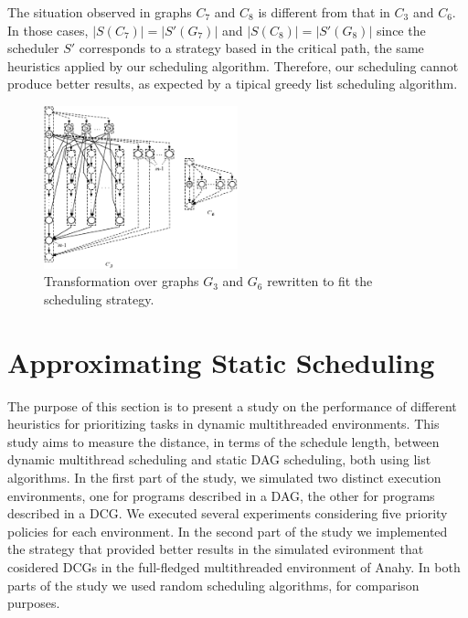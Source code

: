 \documentclass[twocolumn]{svjour3}
\begin{document}
The situation observed in graphs $C_7$ and $C_8$ is different from that in $C_3$ and $C_6$. In those cases, $|S(C_7)| = |S'(G_7)|$ and $|S(C_8)| = |S'(G_8)|$ since the scheduler $S'$ corresponds to a strategy based in the {\color{blue}critical path}, the same heuristics applied by our scheduling algorithm. Therefore, our scheduling cannot produce better results, as expected by a tipical greedy list scheduling algorithm.

\begin{figure}[htb]
\begin{center}
\includegraphics[width=0.5\textwidth,angle=0]{figs/cl3_cl6.eps}
\caption{Transformation over graphs $G_3$ and $G_6$ rewritten to fit the scheduling strategy.}
\label{fig:newC3C6}
\end{center}
\end{figure}

\section{Approximating Static Scheduling} \label{sec:practical_results}

{\color{blue}

The purpose of this section is to present a study on the performance of different heuristics for prioritizing tasks in dynamic multithreaded environments. This study aims to measure the distance, in terms of the schedule length, between dynamic multithread scheduling and static DAG scheduling, both using list algorithms. In the first part of the study, we simulated two distinct execution environments, one for programs described in a DAG, the other for programs described in a DCG. We executed several experiments considering five priority policies for each environment. In the second part of the study we implemented the strategy that provided better results in the simulated evironment that cosidered DCGs in the full-fledged multithreaded environment of Anahy. In both parts of the study we used random scheduling algorithms, for comparison purposes. %

}
\end{document}
